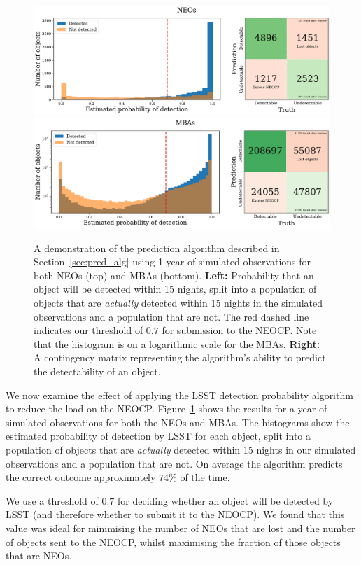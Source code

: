 \documentclass[twocolumn]{aastex631}
\newcommand{\efficiencyAlg}{74}
\newcommand{\thresholdAlg}{0.7}
\begin{document}
\begin{figure}[htb]
    \centering
    \includegraphics[width=\textwidth]{contingency_neo.pdf}
    \includegraphics[width=\textwidth]{contingency_mba.pdf}
    \caption{A demonstration of the prediction algorithm described in Section~\ref{sec:pred_alg} using 1 year of simulated observations for both NEOs (top) and MBAs (bottom). \textbf{Left:} Probability that an object will be detected within 15 nights, split into a population of objects that are \textit{actually} detected within 15 nights in the simulated observations and a population that are not. The red dashed line indicates our threshold of $\thresholdAlg{}$ for submission to the NEOCP. Note that the histogram is on a logarithmic scale for the MBAs. \textbf{Right:} A contingency matrix representing the algorithm's ability to predict the detectability of an object.}
    \label{fig:contingency}
\end{figure}
We now examine the effect of applying the LSST detection probability algorithm to reduce the load on the NEOCP. Figure~\ref{fig:contingency} shows the results for a year of simulated observations for both the NEOs and MBAs. The histograms show the estimated probability of detection by LSST for each object, split into a population of objects that are \textit{actually} detected within 15 nights in our simulated observations and a population that are not. On average the algorithm predicts the correct outcome approximately $\efficiencyAlg{}\%$ of the time.

We use a threshold of $\thresholdAlg{}$ for deciding whether an object will be detected by LSST (and therefore whether to submit it to the NEOCP). We found that this value was ideal for minimising the number of NEOs that are lost and the number of objects sent to the NEOCP, whilst maximising the fraction of those objects that are NEOs.
\end{document}
